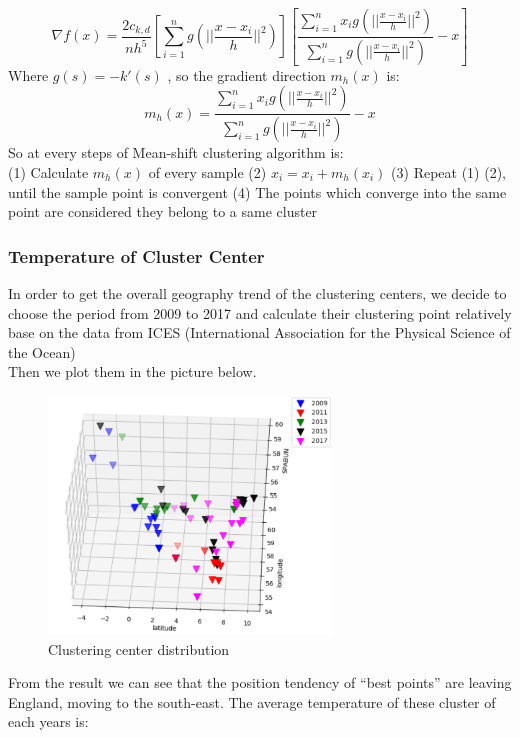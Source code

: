 \documentclass{mcmthesis}
\begin{document}
\begin{equation}\nabla f(x)=\frac{2c_{k,d}}{nh^5}[\sum_{i=1}^n g(||\frac{x-x_{i}}{h}||^2)]
[\frac{
\sum_{i=1}^n x_{i} g (||\frac{x-x_{i}}{h}||^2)}
{\sum_{i=1}^n g (||\frac{x-x_{i}}{h}||^2)}-x]
\end{equation}
Where $g(s)=-k'(s)$ , so the gradient direction $m_{h} (x)$ is:
\begin{equation}
m_{h}(x)=\frac
{\sum_{i=1}^n x_{i} g (||\frac{x-x_{i}}{h}||^2)}
{\sum_{i=1}^n g (||\frac{x-x_{i}}{h}||^2)}-x
\end{equation}
So at every steps of Mean-shift clustering algorithm is:\\
	(1) Calculate $m_{h} (x)$  of every sample
	(2) $x_{i}=x_{i}+m_{h} (x_{i})$
	(3) Repeat (1) (2), until the sample point is convergent
	(4) The points which converge into the same point are considered they belong to a same cluster

\subsubsection{Temperature of Cluster Center}
In order to get the overall geography trend of the clustering centers, we decide to choose the period from 2009 to 2017 and calculate their clustering point relatively base on the data from ICES (International Association for the Physical Science of the Ocean)\\
Then we plot them in the picture below.
\textbf{}
\begin{figure}[h]
\centering
\includegraphics[width=7.5cm]{./figures/cl.png}
\caption{Clustering center distribution}
\end{figure}

From the result we can see that the position tendency of “best points” are leaving England, moving to the south-east. The average temperature of these cluster of each years is:
\end{document}
